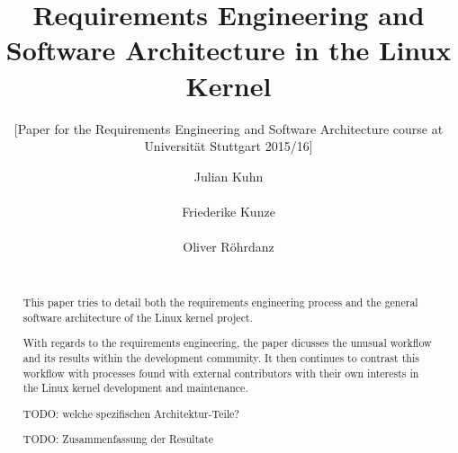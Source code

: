 \documentclass{sig-alternate-05-2015}
\begin{document}
\title{Requirements Engineering and Software Architecture in the Linux Kernel}
\subtitle{[Paper for the Requirements Engineering and Software Architecture course at Universität Stuttgart 2015/16]}

\author{
    \alignauthor Julian Kuhn\\
        \\
    \alignauthor Friederike Kunze\\
        \\
    \alignauthor Oliver R{\"o}hrdanz\\
        \\
}

\maketitle

\begin{abstract}

This paper tries to detail both the requirements engineering process and the general software architecture of the Linux kernel project.

With regards to the requirements engineering, the paper dicusses the unusual workflow and its results within the development community.
It then continues to contrast this workflow with processes found with external contributors with their own interests in the Linux kernel development and maintenance.

TODO: welche spezifischen Architektur-Teile?

TODO: Zusammenfassung der Resultate

\end{abstract}

%
\begin{CCSXML}
\end{CCSXML}




\printccsdesc{}
\end{document}
